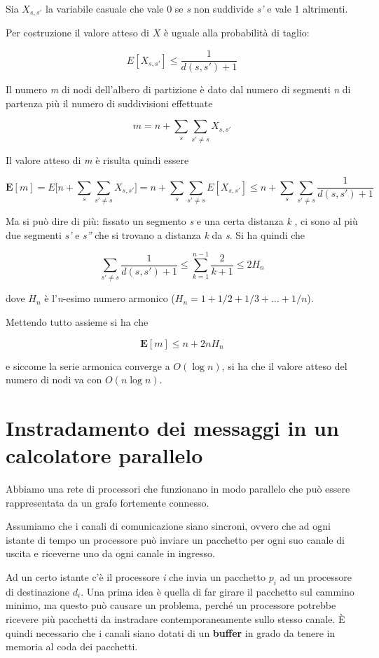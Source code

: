 Sia $X_{s,s'}$ la variabile casuale che vale 0 se \emph{s} non suddivide \emph{s'} e vale 1 altrimenti.

Per costruzione il valore atteso di $X$ è uguale alla probabilità di taglio:

$$
E[X_{s,s'}] \leq \frac{1}{d(s,s') +1}
$$

Il numero \emph{m} di nodi dell'albero di partizione è dato dal numero di segmenti \emph{n} di partenza più il numero di suddivisioni
effettuate

$$
m = n + \sum\limits_{s} \sum\limits_{s' \neq s}X_{s,s'}
$$

Il valore atteso di \emph{m} è risulta quindi essere

$$
\textbf{E}[m] = E\Bigg[n + \sum\limits_{s} \sum\limits_{s' \neq s}X_{s,s'} \Bigg] = n + \sum\limits_{s} \sum\limits_{s' \neq s} E[X_{s,s'}] \leq n + \sum\limits_{s} \sum\limits_{s' \neq s}  \frac{1}{d(s,s')+1}
$$

Ma si può dire di più: fissato un segmento \emph{s} e una certa distanza \emph{k} , ci sono al più due segmenti \emph{s'} e \emph{s''} che si
trovano a distanza \emph{k} da \emph{s}. 
Si ha quindi che

$$
\sum\limits_{s' \neq s} \frac{1}{d(s,s')+1} \leq \sum\limits_{k=1}^{n-1} \frac{2}{k+1} \leq 2H_n
$$

dove $H_n$ è l'\emph{n}-esimo numero armonico ($H_n = 1 + 1/2 + 1/3 + \ldots + 1/n$).

Mettendo tutto assieme si ha che

$$
\textbf{E}[m] \leq n + 2nH_n
$$

e siccome la serie armonica converge a $O(\log n)$, si ha che il valore atteso del numero di nodi va con $O(n \log n)$.

\section{Instradamento dei messaggi in un calcolatore parallelo}\label{instradamento-dei-messaggi-in-un-calcolatore-parallelo}

Abbiamo una rete di processori che funzionano in modo parallelo che può essere rappresentata da un grafo fortemente connesso.

Assumiamo che i canali di comunicazione siano sincroni, ovvero che ad ogni istante di tempo un processore può inviare un pacchetto per ogni suo canale di uscita e riceverne uno da ogni canale in ingresso.

Ad un certo istante c'è il processore \emph{i} che invia un pacchetto $p_i$ ad un processore di destinazione $d_i$. 
Una prima idea è quella di far girare il pacchetto sul cammino minimo, ma questo può causare un problema, perché un processore potrebbe ricevere più pacchetti da instradare contemporaneamente sullo stesso canale. 
\`{E} quindi necessario che i canali siano dotati di un \textbf{buffer} in grado da tenere in memoria al coda dei pacchetti.

